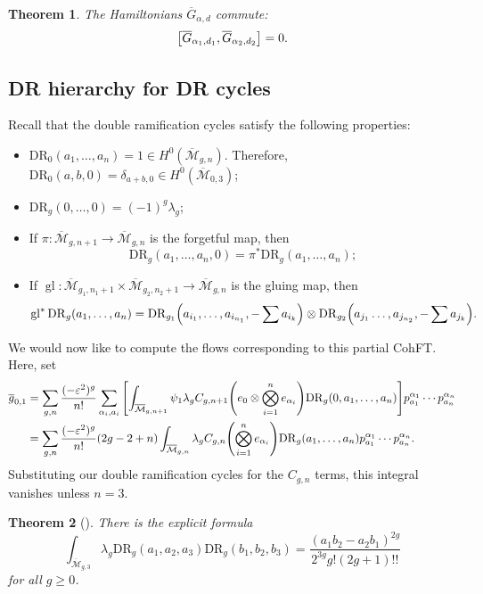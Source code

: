 \documentclass[leqno, openany]{memoir}
\newtheorem{thm}{Theorem}[section]
\theoremstyle{definition}
\theoremstyle{remark}
\theoremstyle{plain}
\theoremstyle{definition}
\theoremstyle{remark}
\newcommand{\ep}{\varepsilon}
\newcommand{\mc}[1]{\mathcal{#1}}
\newcommand{\mr}[1]{\mathrm{#1}}
\newcommand{\on}[1]{\operatorname{#1}}
\newcommand{\ol}[1]{\overline{#1}}
\begin{document}
\begin{thm}
    The Hamiltonians $\ol{G}_{\alpha, d}$ commute:
    \[ \qty[\ol{G}_{\alpha_1, d_1}, \ol{G}_{\alpha_2, d_2}] = 0. \]
\end{thm}

\subsection{DR hierarchy for DR cycles}

Recall that the double ramification cycles satisfy the following properties:
\begin{itemize}
    \item $\mr{DR}_0(a_1, \ldots, a_n) = 1 \in H^0(\ol{\mc{M}}_{g, n})$. Therefore, $\mr{DR}_0(a, b, 0) = \delta_{a+b,0} \in H^0(\ol{\mc{M}}_{0,3})$;
    \item $\mr{DR}_g(0, \ldots, 0) = (-1)^g \lambda_g$;
    \item If $\pi \colon \ol{\mc{M}}_{g, n+1} \to \ol{\mc{M}}_{g, n}$ is the forgetful map, then
        \[ \mr{DR}_{g}(a_1, \ldots, a_n, 0) = \pi^* \mr{DR}_g(a_1, \ldots, a_n); \]
    \item If $\on{gl} \colon \ol{\mc{M}}_{g_1, n_1+1} \times \ol{ \mc{M}}_{g_2, n_2+1}  \to \ol{\mc{M}}_{g,n}$ is the gluing map, then
        \[ \on{gl}^* \mr{DR}_g(a_1, \ldots, a_n) = \mr{DR}_{g_1}\qty(a_{i_1}, \ldots, a_{i_{n_1}}, -\sum a_{i_k}) \otimes \mr{DR}_{g_2}\qty(a_{j_1} \ldots, a_{j_{n_2}}, -\sum a_{j_k}). \]
\end{itemize}

We would now like to compute the flows corresponding to this partial CohFT. Here, set
\begin{align*} 
    \ol{g}_{0,1} &= \sum_{g, n} \frac{(-\ep^2)^g}{n!} \sum_{\alpha_i, a_i} \qty[\int_{\ol{\mc{M}}_{g, n+1}} \psi_1 \lambda_g C_{g, n+1}\qty(e_0 \otimes \bigotimes_{i=1}^n e_{\alpha_i}) \mr{DR}_g(0, a_1, \ldots, a_n)] p_{a_1}^{\alpha_1} \cdots p_{a_n}^{\alpha_n} \\
    &= \sum_{g, n} \frac{(-\ep^2)^g}{n!}(2g-2+n) \int_{\ol{\mc{M}}_{g, n}} \lambda_g C_{g, n}\qty(\bigotimes_{i=1}^n e_{\alpha_i}) \mr{DR}_g(a_1, \ldots, a_n) p_{a_1}^{\alpha_1} \cdots p_{a_n}^{\alpha_n}.
\end{align*}
Substituting our double ramification cycles for the $C_{g, n}$ terms, this integral vanishes unless $n=3$.

\begin{thm}[\cite{drnckdv}]
    There is the explicit formula
    \[ \int_{\ol{\mc{M}}_{g, 3}} \lambda_g \mr{DR}_g(a_1, a_2, a_3) \mr{DR}_g(b_1,b_2, b_3) = \frac{(a_1b_2 - a_2 b_1)^{2g}}{2^{3g}g!(2g+1)!!} \]
    for all $g \geq 0$.
\end{thm}
\end{document}
